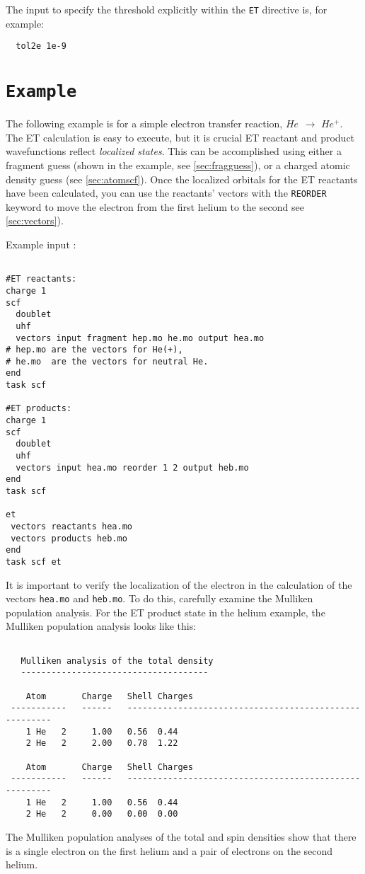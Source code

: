 The input to specify the threshold explicitly within the \verb+ET+
directive is, for example:

\begin{verbatim}
  tol2e 1e-9
\end{verbatim}

\section{{\tt Example}}

The following example is for a simple electron transfer reaction, $He_{}$ $\rightarrow$ $He^{ +}$.
The ET calculation is easy to execute, but it is crucial ET reactant and product
wavefunctions reflect {\em localized states}. This can be accomplished
using either a fragment guess (shown in the example, see \ref{sec:fragguess}), or a charged atomic
density guess (see \ref{sec:atomscf}). 
Once the localized orbitals for the ET reactants have been calculated, you can use the 
reactants' vectors with the
\verb+REORDER+ keyword to move the electron from the first helium to the second see \ref{sec:vectors}).

Example input :
\begin{verbatim}

#ET reactants:
charge 1
scf 
  doublet
  uhf
  vectors input fragment hep.mo he.mo output hea.mo 
# hep.mo are the vectors for He(+), 
# he.mo  are the vectors for neutral He.
end 
task scf

#ET products:
charge 1
scf 
  doublet
  uhf
  vectors input hea.mo reorder 1 2 output heb.mo 
end 
task scf

et
 vectors reactants hea.mo 
 vectors products heb.mo
end
task scf et       

\end{verbatim}
It is important to verify the localization of the electron in the calculation 
of the vectors \verb+hea.mo+ and \verb+heb.mo+. To do this, carefully examine the Mulliken population
analysis.  For the ET product state in the helium example, the Mulliken population
analysis looks like this:

\begin{verbatim}

   Mulliken analysis of the total density
   -------------------------------------

    Atom       Charge   Shell Charges
 -----------   ------   -------------------------------------------------------
    1 He   2     1.00   0.56  0.44
    2 He   2     2.00   0.78  1.22

    Atom       Charge   Shell Charges
 -----------   ------   -------------------------------------------------------
    1 He   2     1.00   0.56  0.44
    2 He   2     0.00   0.00  0.00
\end{verbatim}
The Mulliken population analyses of the total and spin densities show that there is a single electron on
the first helium and a pair of electrons on the second helium.  

